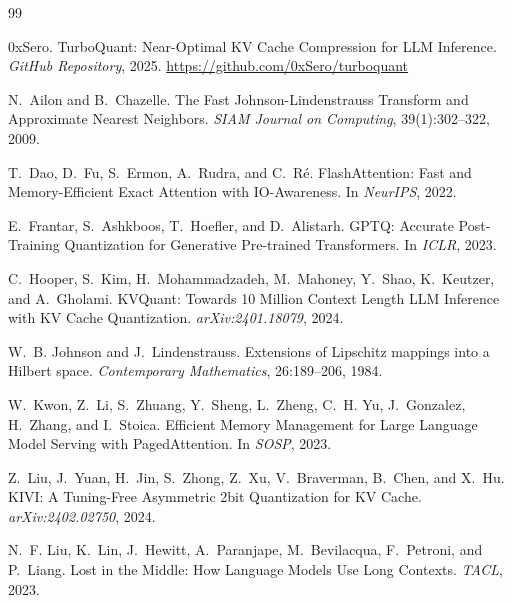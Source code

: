 \documentclass{article}
\begin{document}

\begin{thebibliography}{99}

0xSero.
\newblock TurboQuant: Near-Optimal KV Cache Compression for LLM Inference.
\newblock \textit{GitHub Repository}, 2025.
\newblock \url{https://github.com/0xSero/turboquant}

N.~Ailon and B.~Chazelle.
\newblock The Fast Johnson-Lindenstrauss Transform and Approximate Nearest Neighbors.
\newblock \textit{SIAM Journal on Computing}, 39(1):302--322, 2009.

T.~Dao, D.~Fu, S.~Ermon, A.~Rudra, and C.~R{\'e}.
\newblock FlashAttention: Fast and Memory-Efficient Exact Attention with IO-Awareness.
\newblock In \textit{NeurIPS}, 2022.

E.~Frantar, S.~Ashkboos, T.~Hoefler, and D.~Alistarh.
\newblock GPTQ: Accurate Post-Training Quantization for Generative Pre-trained Transformers.
\newblock In \textit{ICLR}, 2023.

C.~Hooper, S.~Kim, H.~Mohammadzadeh, M.~Mahoney, Y.~Shao, K.~Keutzer, and A.~Gholami.
\newblock KVQuant: Towards 10 Million Context Length LLM Inference with KV Cache Quantization.
\newblock \textit{arXiv:2401.18079}, 2024.

W.~B. Johnson and J.~Lindenstrauss.
\newblock Extensions of Lipschitz mappings into a Hilbert space.
\newblock \textit{Contemporary Mathematics}, 26:189--206, 1984.

W.~Kwon, Z.~Li, S.~Zhuang, Y.~Sheng, L.~Zheng, C.~H. Yu, J.~Gonzalez, H.~Zhang, and I.~Stoica.
\newblock Efficient Memory Management for Large Language Model Serving with PagedAttention.
\newblock In \textit{SOSP}, 2023.

Z.~Liu, J.~Yuan, H.~Jin, S.~Zhong, Z.~Xu, V.~Braverman, B.~Chen, and X.~Hu.
\newblock KIVI: A Tuning-Free Asymmetric 2bit Quantization for KV Cache.
\newblock \textit{arXiv:2402.02750}, 2024.

N.~F. Liu, K.~Lin, J.~Hewitt, A.~Paranjape, M.~Bevilacqua, F.~Petroni, and P.~Liang.
\newblock Lost in the Middle: How Language Models Use Long Contexts.
\newblock \textit{TACL}, 2023.


\end{thebibliography}
\end{document}
